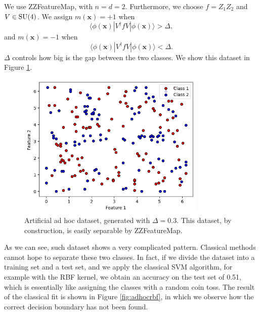 \documentclass[12pt]{article}
\begin{document}
We use ZZFeatureMap, with $n=d=2$. Furthermore, we choose $f=Z_1Z_2$ and $V\in\textup{SU}(4)$. We assign $m(\mathbf{x})=+1$ when 
\begin{equation}
    \langle \phi(\mathbf{x}) |V^\dagger f V|\phi(\mathbf{x})\rangle >\Delta,
\end{equation} 
and $m(\mathbf{x})=-1$ when 
\begin{equation}
    \langle \phi(\mathbf{x}) |V^\dagger f V|\phi(\mathbf{x})\rangle <\Delta.
\end{equation} 
$\Delta$ controls how big is the gap between the two classes. We show this dataset in Figure \ref{fig:adhoc}.
\begin{figure}[h!]
    \centering
    \includegraphics[width=0.8\textwidth]{images/adhoc.png}
    \caption{Artificial ad hoc dataset, generated with $\Delta=0.3$. This dataset, by construction, is easily separable by ZZFeatureMap.}
    \label{fig:adhoc}
\end{figure}
As we can see, such dataset shows a very complicated pattern. Classical methods cannot hope to separate these two classes. In fact, if we divide the dataset into a training set and a test set, and we apply the classical SVM algorithm, for example with the RBF kernel, we obtain an accuracy on the test set of 0.51, which is essentially like assigning the classes with a random coin toss. The result of the classical fit is shown in Figure \ref{fig:adhocrbf}, in which we observe how the correct decision boundary has not been found. 
\end{document}
